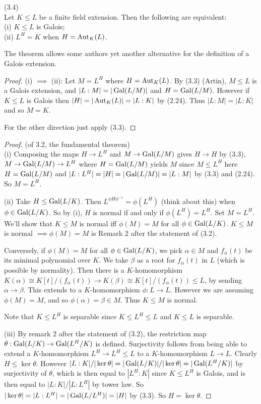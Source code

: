 \documentclass[a4paper]{article}
\begin{document}
\begin{thm} (3.4)\\
Let $K \leq L$ be a finite field extension. Then the following are equivalent:\\
(i) $K \leq L$ is Galois;\\
(ii) $L^H = K$ when $H = \operatorname{Aut}_K(L)$.
\begin{rem}
The theorem allows some authors yet another alternative for the definition of a Galois extension.
\end{rem}

\begin{proof}
(i) $\implies$ (ii): Let $M = L^H$ where $H = \operatorname{Aut}_K(L)$. By (3.3) (Artin), $M \leq L$ is a Galois extension, and $|L:M| = |\operatorname{Gal}(L/M)|$ and $H=\operatorname{Gal}(L/M)$. However if $K \leq L$ is Galois then $|H| = |\operatorname{Aut}_K(L)| = |L:K|$ by (2.24). Thus $|L:M| = |L:K|$ and so $M=K$.

For the other direction just apply (3.3).
\end{proof}
\end{thm}

\begin{proof} (of 3.2, the fundamental theorem)\\
(i) Composing the maps $H \to L^H$ and $M \to \operatorname{Gal}(L/M)$ gives $H \to H$ by (3.3), $M \to \operatorname{Gal}(L/M) \to L^H$ where $H = \operatorname{Gal}(L/M)$ yields $M$ since $M \leq L^H$ here $H = \operatorname{Gal}(L/M)$ and $|L:L^H| = |H| = |\operatorname{Gal}(L/M)| = |L:M|$ by (3.3) and (2.24). So $M=L^H$.

(ii) Take $H \leq \operatorname{Gal}(L/K)$. Then $L^{\phi H \phi^{-1}} = \phi(L^H)$ (think about this) when $\phi \in \operatorname{Gal}(L/K)$. So by (i), $H$ is normal if and only if $\phi(L^H) = L^H$. Set $M = L^H$. We'll show that $K \leq M$ is normal iff $\phi(M) = M$ for all $\phi \in \operatorname{Gal}(L/K)$. $K \leq M$ is normal $\implies \phi(M) = M$ is Remark 2 after the statement of (3.2).

Conversely, if $\phi(M) = M$ for all $\phi \in \operatorname{Gal}(L/K)$, we pick $\alpha \in M$ and $f_\alpha(t)$ be its minimal polynomial over $K$. We take $\beta$ as a root for $f_\alpha(t)$ in $L$ (which is possible by normality). Then there is a $K$-homomorphism $K(\alpha) \cong K[t] / (f_\alpha(t)) \to K(\beta) \cong K[t] / (f_\alpha(t)) \leq L$, by sending $\alpha \to \beta$. This extends to a $K$-homomorphism $\phi:L \to L$. However we are assuming $\phi(M) = M$, and so $\phi(\alpha) = \beta \in M$. Thus $K \leq M$ is normal.

Note that $K\leq L^H$ is separable since $K \leq L^H \leq L$ and $K \leq L$ is separable.

(iii) By remark 2 after the statement of (3.2), the restriction map $\theta: \operatorname{Gal}(L/K) \to \operatorname{Gal}(L^H/K)$ is defined. Surjectivity follows from being able to extend a $K$-homomorphism $L^H \to L^H \leq L$ to a $K$-homomorphism $L \to L$. Clearly $H \leq \ker \theta$. However $|L:K|/|\ker \theta| = |\operatorname{Gal}(L/K)| / |\ker \theta| = |\operatorname{Gal}(L^H/K)|$ by surjectivity of $\theta$, which is then equal to $|L^H : K|$ since $K \leq L^H$ is Galois, and is then equal to $|L:K| / |L:L^H|$ by tower law. So $|\ker \theta| = |L:L^H| = |\operatorname{Gal}(L/L^H)| = |H|$ by (3.3). So $H = \ker \theta$.

\end{proof}
\end{document}
